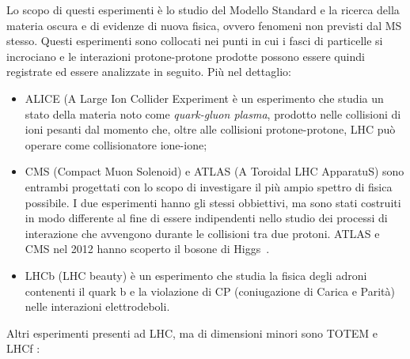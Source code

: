 Lo scopo di questi esperimenti è lo studio del Modello Standard e la ricerca della materia oscura e di evidenze di nuova fisica, ovvero fenomeni non previsti dal MS stesso. Questi esperimenti sono collocati nei punti in cui i fasci di particelle si incrociano e le interazioni protone-protone prodotte possono essere quindi registrate ed essere analizzate in seguito. Pi\`u nel dettaglio:
\begin{itemize}
\item ALICE (A Large Ion Collider Experiment \`e un esperimento che studia un stato della materia noto come {\em quark-gluon plasma}, prodotto nelle collisioni di ioni pesanti dal momento che, oltre alle collisioni protone-protone, LHC pu\`o operare come collisionatore ione-ione;
\item CMS (Compact Muon Solenoid) e ATLAS (A Toroidal LHC ApparatuS) sono entrambi progettati con lo scopo di investigare il più ampio spettro di fisica possibile. I due esperimenti hanno gli stessi obbiettivi, ma sono stati costruiti in modo differente al fine di essere indipendenti nello studio dei processi di interazione che avvengono durante le collisioni tra due protoni. ATLAS e CMS nel 2012 hanno scoperto il bosone di Higgs~\cite{scopertahiggs}. 
\item LHCb (LHC beauty)  \`e un esperimento che studia la fisica degli adroni contenenti il quark b e la violazione di CP (coniugazione di Carica e Parità) nelle interazioni elettrodeboli.
\end{itemize}
Altri esperimenti presenti ad LHC, ma di dimensioni minori sono TOTEM \cite{Anelli:2008zza} e LHCf \cite{LHCf}:
